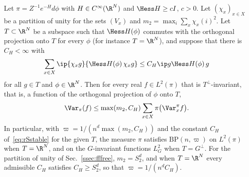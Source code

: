 \begin{theorem}\label{thm:rSwitten}
Let $\pi=Z^{-1}e^{-H}d\phi$ with $H\in C^\infty(\R^N)$ and $\Hess H\ge cI$,
$c>0$. Let $(\chi_x)_{x\in X}$ be a partition of unity for the sets $(V_x)$
and $m_2=\max_i\sum_x\chi_x(i)^2$. Let $T\subset\R^N$ be a subspace such
that $\Hess H(\phi)$ commutes with the orthogonal projection onto $T$ for
every $\phi$ (for instance $T=\R^N$), and suppose that there is $C_H<\infty$
with
\begin{equation}\label{eq:rSstable}
\sum_{x\in X}\ip{\chi_xg}{\Hess H(\phi)\,\chi_xg}\le C_H\ip g{\Hess H(\phi)\,g}
\end{equation}
for all $g\in T$ and $\phi\in\R^N$.
Then for every real $f\in L^2(\pi)$ that is $T^\perp$-invariant, that is,
a function of the orthogonal projection of $\phi$ onto $T$,
\[
\Var_\pi(f)\le\max(m_2,C_H)\sum_{x\in X}\pi\bigl(\Var^\pi_xf\bigr).
\]
In particular, with $\varpi=1/(n^d\max(m_2,C_H))$ and the constant
$C_H$ of~\eqref{eq:rSstable} for the given $T$, the measure $\pi$ satisfies
$\mathrm{BP}(n,\varpi)$ on $L^2(\pi)$ when $T=\R^N$, and on the
$G$-invariant functions $L^2_G$ when $T=G^\perp$. For the partition of unity of
Sec.~\ref{ssec:fffree}, $m_2=S_2^d$, and when $T=\R^N$ every admissible
$C_H$ satisfies $C_H\ge S_2^d$, so that $\varpi=1/(n^dC_H)$.
\end{theorem}


